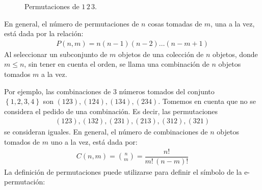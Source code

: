 \begin{figure}[H]
\centering
{}
\hspace{2cm}
\caption{Permutaciones de $1 \, 2 \, 3$.}
\label{fig:figura_01_01}
\end{figure}
En general, el número de permutaciones de $n$ cosas tomadas de $m$, una a la vez, está dada por la relación:
\begin{align*}
P(n, m) = n (n - 1)(n - 2) \ldots (n - m +1)
\end{align*}
Al seleccionar un subconjunto de $m$ objetos de una colección de $n$ objetos, donde $m \leq n$, sin tener en cuenta el orden, se llama una combinación de $n$ objetos tomados $m$ a la vez.
\par
Por ejemplo, las combinaciones de $3$ números tomados del conjunto \\ $\left\{ 1, 2, 3, 4 \right\}$ son $(123), (124), (134), (234)$. Tomemos en cuenta que no se considera el pedido de una combinación. Es decir, las permutaciones
\begin{align*}
(123), (132), (231), (213), (312), (321)
\end{align*}
se consideran iguales. En general, el número de combinaciones de $n$ objetos tomados de $m$ uno a la vez, está dada por:
\begin{align*}
C(n, m) = \binom{n}{m} = \dfrac{n!}{m! \, (n - m)!}
\end{align*}
La definición de permutaciones puede utilizarse para definir el símbolo de la e-permutación:
